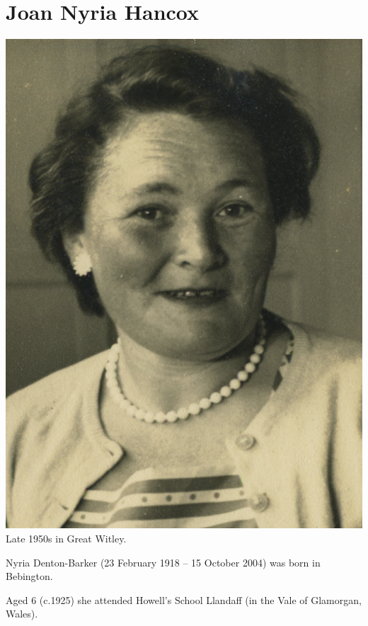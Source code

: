 \section{Joan Nyria Hancox}\label{Joan_Nyria_Hancox}

\begin{center}
\includegraphics[width=0.8\linewidth]{photos/Joan_Nyria_Hancox} \\
{\footnotesize Late 1950s in Great Witley.\cite{FlickrNyria}}
\end{center}

Nyria Denton-Barker (23 February 1918 -- 15 October 2004) was born in Bebington.

Aged 6 (c.1925) she attended Howell's School Llandaff (in the Vale of Glamorgan, Wales).\cite{OralHistoryJDB2008}

